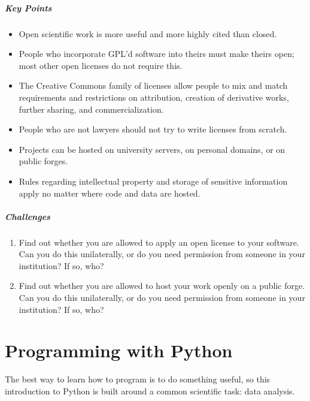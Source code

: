 \documentclass[]{book}
\begin{document}
\mbox{}\paragraph{Key Points}

\begin{itemize}
\item
  Open scientific work is more useful and more highly cited than closed.
\item
  People who incorporate GPL'd software into theirs must make theirs
  open; most other open licenses do not require this.
\item
  The Creative Commons family of licenses allow people to mix and match
  requirements and restrictions on attribution, creation of derivative
  works, further sharing, and commercialization.
\item
  People who are not lawyers should not try to write licenses from
  scratch.
\item
  Projects can be hosted on university servers, on personal domains, or
  on public forges.
\item
  Rules regarding intellectual property and storage of sensitive
  information apply no matter where code and data are hosted.
\end{itemize}

\mbox{}\paragraph{Challenges}

\begin{enumerate}
\item
  Find out whether you are allowed to apply an open license to your
  software. Can you do this unilaterally, or do you need permission from
  someone in your institution? If so, who?
\item
  Find out whether you are allowed to host your work openly on a public
  forge. Can you do this unilaterally, or do you need permission from
  someone in your institution? If so, who?
\end{enumerate}

\chapter{Programming with Python}\label{programming-with-python}

The best way to learn how to program is to do something useful, so this
introduction to Python is built around a common scientific task: data
analysis.
\end{document}
